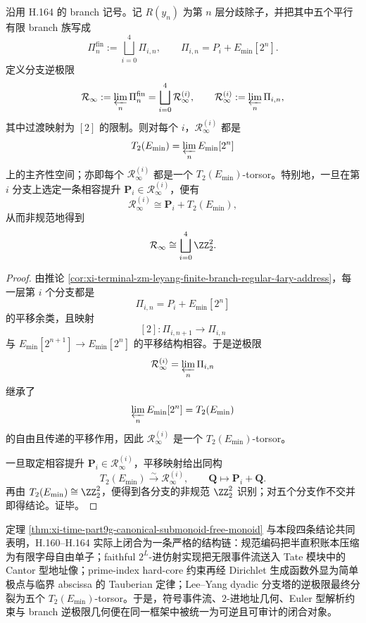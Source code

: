 \begin{theorem}\label{thm:xi-time-part62d-leyang-branch-inverse-limit-five-torsors}
沿用 H.164 的 branch 记号。记 \(R(y_n)\) 为第 \(n\) 层分歧除子，并把其中五个平行有限 branch 族写成
\[
\Pi_n^{\mathrm{fin}}:=\bigsqcup_{i=0}^{4}\Pi_{i,n},
\qquad
\Pi_{i,n}=P_i+E_{\min}[2^n].
\]
定义分支逆极限
\[
\mathcal R_\infty:=\varprojlim_n \Pi_n^{\mathrm{fin}}
=
\bigsqcup_{i=0}^{4}\mathcal R_\infty^{(i)},
\qquad
\mathcal R_\infty^{(i)}:=\varprojlim_n \Pi_{i,n},
\]
其中过渡映射为 \([2]\) 的限制。则对每个 \(i\)，\(\mathcal R_\infty^{(i)}\) 都是
\[
T_2(E_{\min})=\varprojlim_n E_{\min}[2^n]
\]
上的主齐性空间；亦即每个 \(\mathcal R_\infty^{(i)}\) 都是一个 \(T_2(E_{\min})\)-torsor。特别地，一旦在第 \(i\) 分支上选定一条相容提升 \(\mathbf P_i\in \mathcal R_\infty^{(i)}\)，便有
\[
\mathcal R_\infty^{(i)}\cong \mathbf P_i+T_2(E_{\min}),
\]
从而非规范地得到
\[
\mathcal R_\infty\cong \bigsqcup_{i=0}^{4}\ZZ_2^2.
\]
\end{theorem}
\begin{proof}
由推论 \ref{cor:xi-terminal-zm-leyang-finite-branch-regular-4ary-address}，每一层第 \(i\) 个分支都是
\[
\Pi_{i,n}=P_i+E_{\min}[2^n]
\]
的平移余类，且映射
\[
[2]:\Pi_{i,n+1}\longrightarrow \Pi_{i,n}
\]
与 \(E_{\min}[2^{n+1}]\to E_{\min}[2^n]\) 的平移结构相容。于是逆极限
\[
\mathcal R_\infty^{(i)}=\varprojlim_n \Pi_{i,n}
\]
继承了
\[
\varprojlim_n E_{\min}[2^n]=T_2(E_{\min})
\]
的自由且传递的平移作用，因此 \(\mathcal R_\infty^{(i)}\) 是一个 \(T_2(E_{\min})\)-torsor。

一旦取定相容提升 \(\mathbf P_i\in \mathcal R_\infty^{(i)}\)，平移映射给出同构
\[
T_2(E_{\min})\stackrel{\sim}{\longrightarrow}\mathcal R_\infty^{(i)},
\qquad
\mathbf Q\longmapsto \mathbf P_i+\mathbf Q.
\]
再由 \(T_2(E_{\min})\cong \ZZ_2^2\)，便得到各分支的非规范 \(\ZZ_2^2\) 识别；对五个分支作不交并即得结论。证毕。
\end{proof}

\noindent
定理 \ref{thm:xi-time-part9g-canonical-submonoid-free-monoid} 与本段四条结论共同表明，H.160--H.164 实际上闭合为一条严格的结构链：规范编码把半直积账本压缩为有限字母自由单子；faithful \(2^L\)-进仿射实现把无限事件流送入 Tate 模块中的 Cantor 型地址像；prime-index hard-core 约束再经 Dirichlet 生成函数外显为简单极点与临界 abscissa 的 Tauberian 定律；Lee--Yang dyadic 分支塔的逆极限最终分裂为五个 \(T_2(E_{\min})\)-torsor。于是，符号事件流、\(2\)-进地址几何、Euler 型解析约束与 branch 逆极限几何便在同一框架中被统一为可逆且可审计的闭合对象。

\endinput
